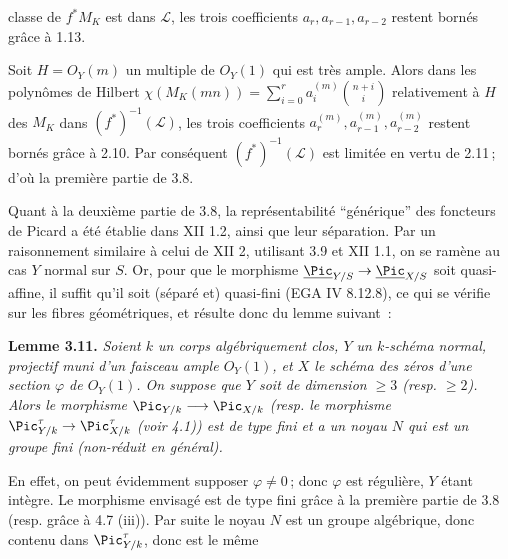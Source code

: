
classe de \(f^*M_K\) est dans \(\mathcal L\), les trois coefficients \(a_r,a_{r-1},a_{r-2}\) restent born\'es gr\^ace \`a 1.13.

Soit \(H={O}_Y(m)\) un multiple de \({O}_Y(1)\) qui est tr\`es ample. Alors dans les polyn\^omes de Hilbert \(\chi(M_K(mn))=\sum_{i=0}^{r}a_i^{(m)}\binom{n+i}{i}\) relativement \`a \(H\) des \(M_K\) dans \((f^*)^{-1}(\mathcal L)\), les trois coefficients \(a_r^{(m)},a_{r-1}^{(m)},a_{r-2}^{(m)}\) restent born\'es gr\^ace \`a 2.10. Par cons\'equent \((f^*)^{-1}(\mathcal L)\) est limit\'ee en vertu de 2.11\,; d'o\`u la premi\`ere partie de 3.8.

Quant \`a la deuxi\`eme partie de 3.8, la repr\'esentabilit\'e ``g\'en\'erique'' des foncteurs de Picard a \'et\'e \'etablie dans XII 1.2, ainsi que leur s\'eparation. Par un raisonnement similaire \`a celui de XII 2, utilisant 3.9 et XII 1.1, on se ram\`ene au cas \(Y\) normal sur \(S\). Or, pour que le morphisme \(\underline{\Pic}_{Y/S}\to\underline{\Pic}_{X/S}\) soit quasi-affine, il suffit qu'il soit (s\'epar\'e et) quasi-fini (EGA IV 8.12.8), ce qui se v\'erifie sur les fibres g\'eom\'etriques, et r\'esulte donc du lemme suivant~:

\textbf{Lemme 3.11.} \emph{Soient \(k\) un corps alg\'ebriquement clos, \(Y\) un \(k\)-sch\'ema normal, projectif muni d'un faisceau ample \({O}_Y(1)\), et \(X\) le sch\'ema des z\'eros d'une section \(\varphi\) de \({O}_Y(1)\). On suppose que \(Y\) soit de dimension \(\ge3\) (resp. \(\ge2\)). Alors le morphisme \(\Pic_{Y/k}\longrightarrow\Pic_{X/k}\) (resp. le morphisme \(\Pic^\tau_{Y/k}\to\Pic^\tau_{X/k}\) (voir 4.1)) est de type fini et a un noyau \(N\) qui est un groupe fini (non-r\'eduit en g\'en\'eral).}

En effet, on peut \'evidemment supposer \(\varphi\ne0\)\,; donc \(\varphi\) est r\'eguli\`ere, \(Y\) \'etant int\`egre. Le morphisme envisag\'e est de type fini gr\^ace \`a la premi\`ere partie de 3.8 (resp. gr\^ace \`a 4.7 (iii)). Par suite le noyau \(N\) est un groupe alg\'ebrique, donc contenu dans \(\Pic^\tau_{Y/k}\), donc est le m\^eme
